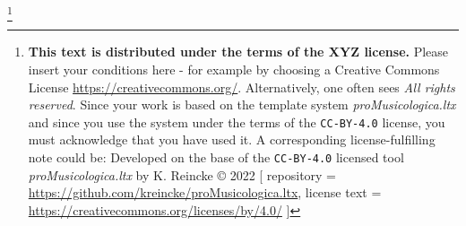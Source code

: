

\footnote{\textbf{This text is distributed under the terms of the XYZ license.} Please insert your conditions here - for example by choosing a Creative Commons License \href{https://creativecommons.org/}{https://creativecommons.org/}. Alternatively, one often sees \emph{All rights reserved}. \newline
Since your work is based on the template system \textit{proMusicologica.ltx} and since you use the system under the terms of the \texttt{CC-BY-4.0} license, you must acknowledge that you have used it. A corresponding license-fulfilling note could be:\newline
Developed on the base of the \texttt{CC-BY-4.0} licensed tool \textit{proMusicologica.ltx} by K. Reincke \copyright{} 2022 [
repository = \href{https://github.com/kreincke/proMusicologica.ltx}{https://github.com/kreincke/proMusicologica.ltx},
license text = \href{https://creativecommons.org/licenses/by/4.0/}{https://creativecommons.org/licenses/by/4.0/} ]
}
